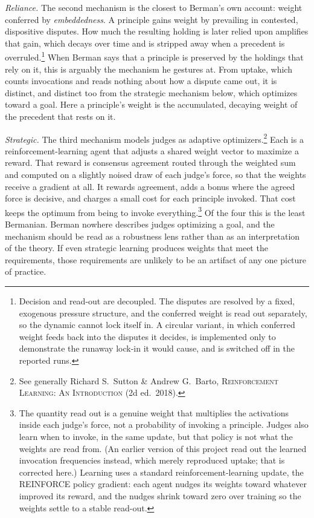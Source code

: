 \textit{Reliance.} The second mechanism is the closest to Berman's own
account: weight conferred by \textit{embeddedness}. A principle gains weight by prevailing in contested, dispositive disputes.
How much the resulting holding is later relied upon amplifies that gain,
which decays over time and is stripped away when a precedent is overruled.\footnote{Decision and
read-out are decoupled. The disputes are resolved by a fixed, exogenous
pressure structure, and the conferred weight is read out separately, so the
dynamic cannot lock itself in. A circular variant, in which conferred weight
feeds back into the disputes it decides, is implemented only to demonstrate
the runaway lock-in it would cause, and is switched off in the reported
runs.} When Berman says that a principle is preserved by the holdings that rely on
it, this is arguably the mechanism he gestures at. From uptake, which counts invocations and reads nothing about how a dispute
came out, it is distinct, and distinct too from the strategic mechanism below,
which optimizes toward a goal. Here a principle's weight
is the accumulated, decaying weight of the precedent that rests on it.

\textit{Strategic.} The third mechanism models judges as adaptive
optimizers.\footnote{See generally Richard S.\ Sutton \& Andrew G.\ Barto,
\textsc{Reinforcement Learning: An Introduction} (2d ed.\ 2018).} Each is a reinforcement-learning agent that adjusts a shared weight vector
to maximize a reward. That reward is consensus agreement routed through the weighted sum and
computed on a slightly noised draw of each judge's force, so that the weights
receive a gradient at all. It rewards agreement, adds a bonus where the agreed
force is decisive, and charges a small cost for each principle invoked. That
cost keeps the optimum from being to invoke everything.\footnote{The
quantity read out is a genuine weight that multiplies the activations inside
each judge's force, not a probability of invoking a principle. Judges also
learn when to invoke, in the same update, but that policy is not what the
weights are read from. (An earlier version of this project read out the
learned invocation frequencies instead, which merely reproduced uptake; that
is corrected here.) Learning uses a standard reinforcement-learning update, the REINFORCE
policy gradient: each agent nudges its weights toward whatever improved its
reward, and the nudges shrink toward zero over training so the weights
settle to a stable read-out.} Of the four this is the least Bermanian. Berman nowhere describes judges
optimizing a goal, and the mechanism should be read as a robustness lens
rather than as an interpretation of the theory. If even strategic learning
produces weights that meet the requirements, those requirements are
unlikely to be an artifact of any one picture of practice.

